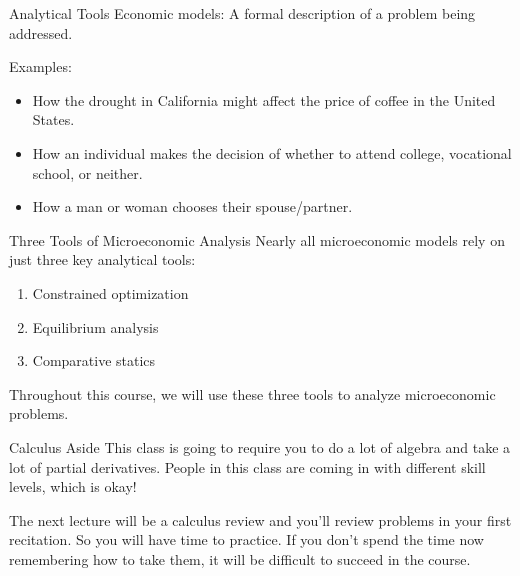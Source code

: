 \documentclass[12pt,t]{beamer}
\begin{document}
\begin{frame}{Analytical Tools}
  Economic models: A formal description of a problem being addressed.

  \bigskip
  Examples:
  \begin{itemize}
    \item How the drought in California might affect the price of coffee in the United States.
    \item How an individual makes the decision of whether to attend college, vocational school, or neither.
    \item How a man or woman chooses their spouse/partner.
  \end{itemize}
\end{frame}

\begin{frame}{Three Tools of Microeconomic Analysis}
  Nearly all microeconomic models rely on just three key analytical tools:
  \begin{enumerate}
    \item Constrained optimization
    \item Equilibrium analysis
    \item Comparative statics
  \end{enumerate}

  \bigskip
  Throughout this course, we will use these three tools to analyze microeconomic problems.
\end{frame}

\begin{frame}{Calculus Aside}
  This class is going to require you to do a lot of algebra and take a lot of partial derivatives. People in this class are coming in with different skill levels, which is okay!

  \bigskip
  The next lecture will be a calculus review and you'll review problems in your first recitation.  So you will have time to practice.  If you don't spend the time now remembering how to take them, it will be difficult to succeed in the course.
\end{frame}
\end{document}
